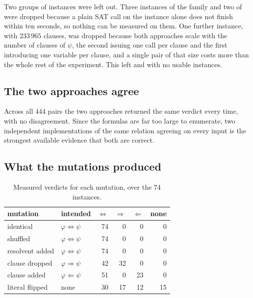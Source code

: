 \documentclass[11pt,a4paper]{article}
\begin{document}
Two groups of instances were left out. Three instances of the 
family and two of  were dropped because a plain SAT call on
the instance alone does not finish within ten seconds, so nothing can be
measured on them. One further instance,  with $233\,965$
clauses, was dropped because both approaches scale with the number of clauses
of $\psi$, the second issuing one call per clause and the first introducing
one variable per clause, and a single pair of that size costs more than the
whole rest of the experiment. This left  and  with
no usable instances.

\subsection*{The two approaches agree}
\label{sec:agreement}

Across all $444$ pairs the two approaches returned the same verdict every
time, with no disagreement. Since the formulas are far too large to enumerate,
two independent implementations of the same relation agreeing on every input
is the strongest available evidence that both are correct.

\subsection*{What the mutations produced}

\begin{table}[H]
\centering
\begin{tabular}{llrrrr}
\toprule
mutation & intended & $\Leftrightarrow$ & $\Rightarrow$ & $\Leftarrow$ & none \\
\midrule
identical & $\varphi \Leftrightarrow \psi$ & 74 & 0 & 0 & 0 \\
shuffled & $\varphi \Leftrightarrow \psi$ & 74 & 0 & 0 & 0 \\
resolvent added & $\varphi \Leftrightarrow \psi$ & 74 & 0 & 0 & 0 \\
clause dropped & $\varphi \Rightarrow \psi$ & 42 & 32 & 0 & 0 \\
clause added & $\varphi \Leftarrow \psi$ & 51 & 0 & 23 & 0 \\
literal flipped & none & 30 & 17 & 12 & 15 \\
\bottomrule
\end{tabular}
\caption{Measured verdicts for each mutation, over the 74 instances.}
\label{tab:mutations}
\end{table}
\end{document}
